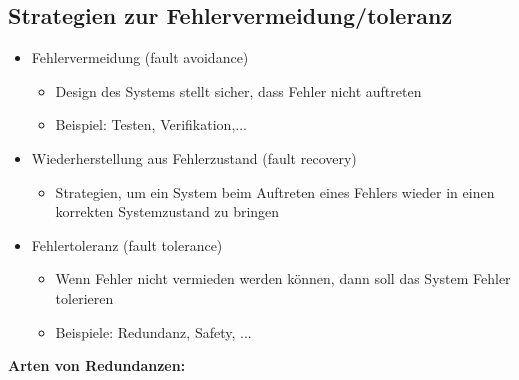 \documentclass[a4paper,12pt]{article}
\begin{document}
\subsection{Strategien zur Fehlervermeidung/toleranz}
\begin{itemize}
\item Fehlervermeidung (fault avoidance)
	\begin{itemize}
	\item Design des Systems stellt sicher, dass Fehler nicht auftreten
	\item Beispiel: Testen, Verifikation,...
	\end{itemize}
\item Wiederherstellung aus Fehlerzustand (fault recovery)
	\begin{itemize}
	\item Strategien, um ein System beim Auftreten eines Fehlers wieder in einen korrekten Systemzustand zu bringen
	\end{itemize}
\item Fehlertoleranz (fault tolerance)
	\begin{itemize}
	\item Wenn Fehler nicht vermieden werden können, dann soll das System Fehler tolerieren
	\item Beispiele: Redundanz, Safety, ...
	\end{itemize}
\end{itemize}
\textbf{Arten von Redundanzen:}
\end{document}

